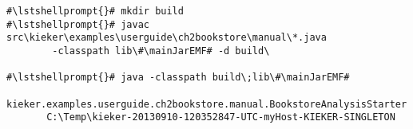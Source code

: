 \begin{lstlisting}[caption=Commands to compile and run the analysis under Windows,label=lst:bookstoreAnalysisStarterWin]
#\lstshellprompt{}# mkdir build
#\lstshellprompt{}# javac src\kieker\examples\userguide\ch2bookstore\manual\*.java 
        -classpath lib\#\mainJarEMF# -d build\

#\lstshellprompt{}# java -classpath build\;lib\#\mainJarEMF#
       kieker.examples.userguide.ch2bookstore.manual.BookstoreAnalysisStarter 
       C:\Temp\kieker-20130910-120352847-UTC-myHost-KIEKER-SINGLETON
\end{lstlisting}	


